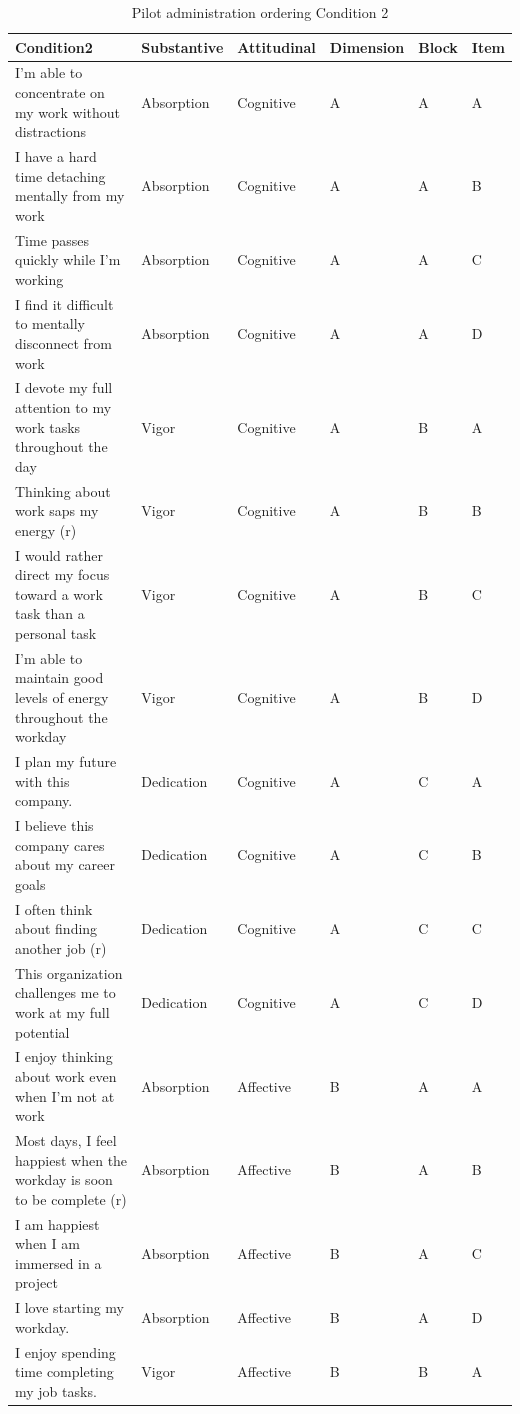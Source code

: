 \documentclass[
]{book}
\begin{document}
\begin{table}

\caption{\label{tab:cond2}Pilot administration ordering Condition 2}
\centering
\begin{tabular}[t]{l|l|l|l|l|l}
\hline
Condition2 & Substantive & Attitudinal & Dimension & Block & Item\\
\hline
I’m able to concentrate on my work without distractions & Absorption & Cognitive & A & A & A\\
\hline
I have a hard time detaching mentally from my work & Absorption & Cognitive & A & A & B\\
\hline
Time passes quickly while I’m working & Absorption & Cognitive & A & A & C\\
\hline
I find it difficult to mentally disconnect from work & Absorption & Cognitive & A & A & D\\
\hline
I devote my full attention to my work tasks throughout the day & Vigor & Cognitive & A & B & A\\
\hline
Thinking about work saps my energy (r) & Vigor & Cognitive & A & B & B\\
\hline
I would rather direct my focus toward a work task than a personal task & Vigor & Cognitive & A & B & C\\
\hline
I’m able to maintain good levels of energy throughout the workday & Vigor & Cognitive & A & B & D\\
\hline
I plan my future with this company. & Dedication & Cognitive & A & C & A\\
\hline
I believe this company cares about my career goals & Dedication & Cognitive & A & C & B\\
\hline
I often think about finding another job (r) & Dedication & Cognitive & A & C & C\\
\hline
This organization challenges me to work at my full potential & Dedication & Cognitive & A & C & D\\
\hline
I enjoy thinking about work even when I’m not at work & Absorption & Affective & B & A & A\\
\hline
Most days, I feel happiest when the workday is soon to be complete (r) & Absorption & Affective & B & A & B\\
\hline
I am happiest when I am immersed in a project & Absorption & Affective & B & A & C\\
\hline
I love starting my workday. & Absorption & Affective & B & A & D\\
\hline
I enjoy spending time completing my job tasks. & Vigor & Affective & B & B & A\\

\end{tabular}
\end{table}
\end{document}

